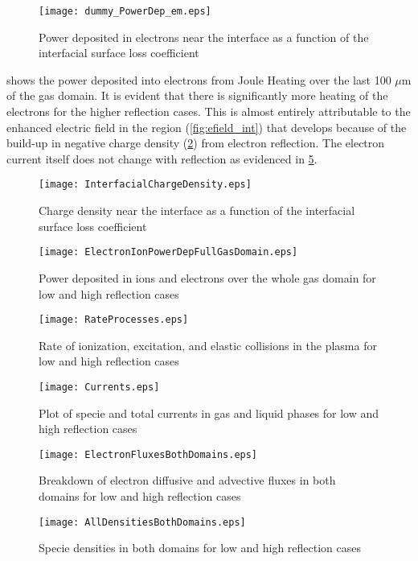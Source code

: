 
\begin{figure}[htpb]
  \centering
  \texttt{[image: dummy\_PowerDep\_em.eps]}
  \caption{Power deposited in electrons near the interface as a function of the interfacial surface loss coefficient}
  \label{fig:powerDep_em_int}
\end{figure}

 shows the power deposited into electrons from Joule Heating over the last 100 $\mu$m of the gas domain. It is evident that there is significantly more heating of the electrons for the higher reflection cases. This is almost entirely attributable to the enhanced electric field in the region (\cref{fig:efield_int}) that develops because of the build-up in negative charge density (\cref{fig:charge_dens_int}) from electron reflection. The electron current itself does not change with reflection as evidenced in \cref{fig:currents}.

\begin{figure}[htpb]
  \centering
  \texttt{[image: InterfacialChargeDensity.eps]}
  \caption{Charge density near the interface as a function of the interfacial surface loss coefficient}
  \label{fig:charge_dens_int}
\end{figure}



\begin{figure}[htpb]
  \centering
  \texttt{[image: ElectronIonPowerDepFullGasDomain.eps]}
  \caption{Power deposited in ions and electrons over the whole gas domain for low and high reflection cases}
  \label{fig:powerDep_em_Arp_full}
\end{figure}

\begin{figure}[htpb]
  \centering
  \texttt{[image: RateProcesses.eps]}
  \caption{Rate of ionization, excitation, and elastic collisions in the plasma for low and high reflection cases}
  \label{fig:rateProc}
\end{figure}

\begin{figure}[htpb]
  \centering
  \texttt{[image: Currents.eps]}
  \caption{Plot of specie and total currents in gas and liquid phases for low and high reflection cases}
  \label{fig:currents}
\end{figure}

\begin{figure}[htpb]
  \centering
  \texttt{[image: ElectronFluxesBothDomains.eps]}
  \caption{Breakdown of electron diffusive and advective fluxes in both domains for low and high reflection cases}
  \label{fig:electron_fluxes}
\end{figure}

\begin{figure}[htpb]
  \centering
  \texttt{[image: AllDensitiesBothDomains.eps]}
  \caption{Specie densities in both domains for low and high reflection cases}
  \label{fig:densities}
\end{figure}
